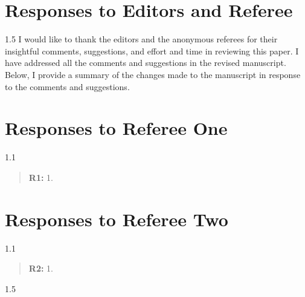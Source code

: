 \documentclass[12pt,english]{article}
\newcommand{\rrquote}{1.1}
\newcommand{\rrxspc}{1.5}
\begin{document}
\begin{refsection}
\setcounter{section}{0}
\renewcommand{\thesection}{\Alph{section}}
\renewcommand{\thesubsection}{\Alph{section}.\arabic{subsection}}
\renewcommand{\thesubsubsection}{\Alph{section}.\arabic{subsection}.\arabic{subsubsection}}

        \section{Responses to Editors and Referee} \label{r&r:responses}
        \begin{spacing}{\rrxspc}
            I would like to thank the editors and the anonymous referees for their insightful comments, suggestions, and effort and time in reviewing this paper. I have addressed all the comments and suggestions in the revised manuscript. Below, I provide a summary of the changes made to the manuscript in response to the comments and suggestions.
        \end{spacing}

    \newpage
    
    \section{Responses to Referee One}
    \begin{spacing}{\rrquote}
    \begin{quotation}
    \textbf{R1: } 1. 
    \end{quotation}
    \end{spacing}


    \section{Responses to Referee Two}
    \begin{spacing}{\rrquote}
    \begin{quotation}
    \textbf{R2: } 1. 
    \end{quotation}
    \end{spacing}
    
    \begin{spacing}{\rrxspc}
    \end{spacing}
    
        
    \clearpage
    \pagebreak
    \end{refsection}
\end{document}
